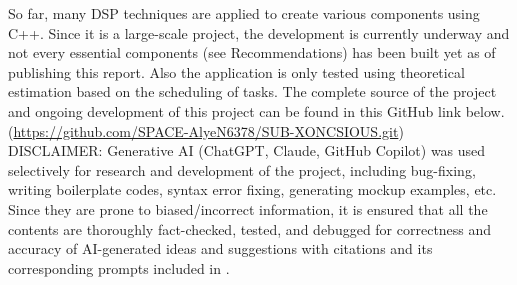 \begin{flushleft}
\hspace{1.5em}
So far, many DSP techniques are applied to create various components using C++. 
Since it is a large-scale project, the development is currently underway and not every 
essential components (see Recommendations) has been built yet as of publishing this report. 
Also the application is only tested using theoretical estimation based on the scheduling of tasks. 
The complete source of the project and ongoing development of this project can be found in this
GitHub link below.
(\url{https://github.com/SPACE-AlyeN6378/SUB-XONCSIOUS.git})
\\[1em]

%
%

\hspace{1.5em}%
DISCLAIMER: Generative AI (ChatGPT, Claude, GitHub Copilot) 
was used selectively for research and development of the project, including bug-fixing,
writing boilerplate codes, syntax error fixing, generating mockup examples, etc. Since they are prone to
biased/incorrect information, it is ensured that all the contents are thoroughly
fact-checked, tested, and debugged for correctness and accuracy of AI-generated ideas
and suggestions with citations and its corresponding prompts included in 
. 
\\[1em]


\end{flushleft}
